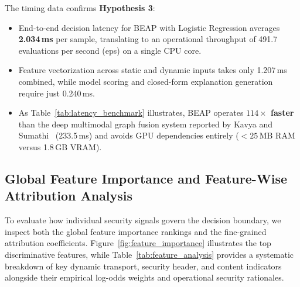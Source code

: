 \documentclass[conference]{IEEEtran}
\begin{document}
The timing data confirms \textbf{Hypothesis 3}:
\begin{itemize}[leftmargin=2.5em]
    \item End-to-end decision latency for BEAP with Logistic Regression averages \textbf{2.034\,ms} per sample, translating to an operational throughput of 491.7 evaluations per second (eps) on a single CPU core.
    \item Feature vectorization across static and dynamic inputs takes only 1.207\,ms combined, while model scoring and closed-form explanation generation require just 0.240\,ms.
    \item As Table~\ref{tab:latency_benchmark} illustrates, BEAP operates \textbf{$114\times$ faster} than the deep multimodal graph fusion system reported by Kavya and Sumathi~\cite{kavya2025access} (233.5\,ms) and avoids GPU dependencies entirely ($<25$\,MB RAM versus 1.8\,GB VRAM).
\end{itemize}

\subsection{Global Feature Importance and Feature-Wise Attribution Analysis}\label{feature-importance-results}

To evaluate how individual security signals govern the decision boundary, we inspect both the global feature importance rankings and the fine-grained attribution coefficients. Figure~\ref{fig:feature_importance} illustrates the top discriminative features, while Table~\ref{tab:feature_analysis} provides a systematic breakdown of key dynamic transport, security header, and content indicators alongside their empirical log-odds weights and operational security rationales.
\end{document}

